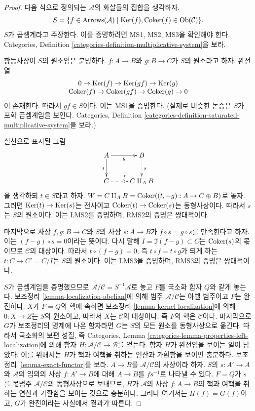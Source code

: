 \begin{proof}
다음 식으로 정의되는 $\mathcal{A}$의 화살들의 집합을 생각하자.
$$
S = \{f \in \text{Arrows}(\mathcal{A}) \mid
\mathop{\mathrm{Ker}}(f), \mathop{\mathrm{Coker}}(f) \in \mathop{\mathrm{Ob}}\nolimits(\mathcal{C}) \}.
$$
$S$가 곱셈계라고 주장한다. 이를 증명하려면 MS1, MS2, MS3을 확인해야
한다. Categories, Definition
\ref{categories-definition-multiplicative-system}을 보라.

\medskip\noindent
항등사상이 $S$의 원소임은 분명하다.
$f : A \to B$와 $g : B \to C$가 $S$의 원소라고 하자. 완전열
$$
\begin{matrix}
0 \to \mathop{\mathrm{Ker}}(f) \to \mathop{\mathrm{Ker}}(gf) \to \mathop{\mathrm{Ker}}(g) \\
\mathop{\mathrm{Coker}}(f) \to \mathop{\mathrm{Coker}}(gf) \to \mathop{\mathrm{Coker}}(g) \to 0
\end{matrix}
$$
이 존재한다. 따라서 $gf \in S$이다. 이는 MS1을 증명한다.
(실제로 비슷한 논증은 $S$가 포화 곱셈계임을 보인다. Categories,
Definition
\ref{categories-definition-saturated-multiplicative-system}을 보라.)

\medskip\noindent
실선으로 표시된 그림
$$
\xymatrix{
A \ar[d]_t \ar[r]_g & B \ar@{..>}[d]^s \\
C \ar@{..>}[r]^f & C \amalg_A B
}
$$
을 생각하되 $t \in S$라고 하자.
$W = C \amalg_A B =  \mathop{\mathrm{Coker}}((t, -g) : A \to C \oplus B)$로 놓자.
그러면 $\mathop{\mathrm{Ker}}(t) \to \mathop{\mathrm{Ker}}(s)$는 전사이고
$\mathop{\mathrm{Coker}}(t) \to \mathop{\mathrm{Coker}}(s)$는 동형사상이다. 따라서 $s$는 $S$의
원소이다. 이는 LMS2를 증명하며, RMS2의 증명은 쌍대적이다.

\medskip\noindent
마지막으로 사상 $f, g : B \to C$와 $S$의 사상 $s : A \to B$가
$f \circ s = g \circ s$를 만족한다고 하자. 이는
$(f - g) \circ s = 0$이라는 뜻이다. 다시 말해
$I = \Im(f - g) \subset C$는 $\mathop{\mathrm{Coker}}(s)$의 몫이므로
$\mathcal{C}$의 대상이다. 따라서 $t \circ (f - g) = 0$, 즉
$t \circ f = t \circ g$가 되게 하는
$t : C \to C' = C/I$는 $S$의 원소이다. 이는 LMS3을 증명하며,
RMS3의 증명은 쌍대적이다.

\medskip\noindent
$S$가 곱셈계임을 증명했으므로
$\mathcal{A}/\mathcal{C} = S^{-1}\mathcal{A}$로 놓고 $F$를 국소화
함자 $Q$와 같게 놓는다. 보조정리 \ref{lemma-localization-abelian}에
의해 범주 $\mathcal{A}/\mathcal{C}$는 아벨 범주이고 $F$는 완전하다.
$X$가 $F = Q$의 핵에 속하면 보조정리
\ref{lemma-kernel-localization}에 의해 $0 : X \to Z$는 $S$의
원소이고, 따라서 $X$는 $\mathcal{C}$의 대상이다. 즉 $F$의 핵은
$\mathcal{C}$이다. 마지막으로 $G$가 보조정리의 명제에 나온
함자라면 $G$는 $S$의 모든 원소를 동형사상으로 옮긴다.
따라서 국소화의 보편 성질, 즉 Categories, Lemma
\ref{categories-lemma-properties-left-localization}에 의해 함자
$H : \mathcal{A}/\mathcal{C} \to \mathcal{B}$를 얻는다.
함자 $H$가 완전임을 보이는 일이 남았다. 이를 위해서는 $H$가 핵과
여핵을 취하는 연산과 가환함을 보이면 충분하다. 보조정리
\ref{lemma-exact-functor}를 보라.
$A \to B$를 $\mathcal{A}/\mathcal{C}$의 사상이라 하자.
$S$의 $s : A' \to A$와 $\mathcal{A}$의 임의의 사상
$f : A' \to B$에 대해 $A \to B$를 $fs^{-1}$로 나타낼 수 있다.
$F = Q$가 $s$를 몫범주 $\mathcal{A}/\mathcal{C}$의 동형사상으로
보내므로, $H$가 $\mathcal{A}$의 사상 $f : A \to B$의 핵과 여핵을
취하는 연산과 가환함을 보이는 것으로 충분하다.
그러나 여기서는 $H(f) = G(f)$이고, $G$가 완전이라는 사실에서 결과가
따른다.
\end{proof}

